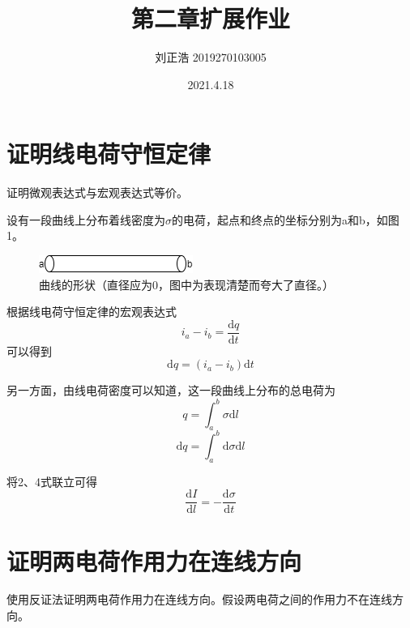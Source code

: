 \documentclass[a4paper]{article}
\title{\heiti\zihao{2} 第二章扩展作业}
\author{\songti 刘正浩 2019270103005}
\date{2021.4.18}
\begin{document}
	\maketitle
	\thispagestyle{empty}


	\tableofcontents

	\section{证明线电荷守恒定律}
		证明微观表达式与宏观表达式等价。
		
		设有一段曲线上分布着线密度为$\sigma$的电荷，起点和终点的坐标分别为a和b，如图1。
		\begin{figure}
			\centering
			\includegraphics[scale=0.8]{1.png}
			\caption{曲线的形状（直径应为0，图中为表现清楚而夸大了直径。）}
		\end{figure}

		根据线电荷守恒定律的宏观表达式
		\begin{equation}
			i_{a} - i_{b} = \frac {\mathrm{d}q} {\mathrm{d}t}
		\end{equation}
		可以得到
		\begin{equation}
			\mathrm{d}q = (i_{a}-i_{b}) \mathrm{d}t
		\end{equation}

		另一方面，由线电荷密度可以知道，这一段曲线上分布的总电荷为
		\begin{equation}
			q = \int _ a ^ b \sigma \mathrm{d}l
		\end{equation}
		\begin{equation}
			\mathrm{d}q = \int _ a ^ b \mathrm{d}\sigma \mathrm{d}l
		\end{equation}

		将2、4式联立可得
		\begin{equation}
			\frac{\mathrm{d}I}{\mathrm{d}l} = - \frac{\mathrm{d}\sigma}{\mathrm{d}t}
		\end{equation}
	\section{证明两电荷作用力在连线方向}
		使用反证法证明两电荷作用力在连线方向。假设两电荷之间的作用力不在连线方向。
\end{document}
